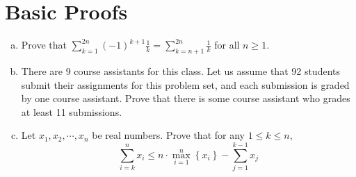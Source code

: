 \documentclass{article}
\begin{document}
\section{Basic Proofs}

\begin{enumerate}[(a)]
	\item Prove that $\sum_{k=1}^{2n}(-1)^{k+1}\frac{1}{k} = \sum_{k=n+1}^{2n}\frac{1}{k}$ for all $n\ge 1.$ 

	\item There are 9 course assistants for this class. Let us assume that 92 students submit their assignments for this problem set, and each submission is graded by one course assistant. Prove that there is some course assistant who grades at least 11 submissions.

	\item Let $x_1, x_2, \cdots, x_n$ be real numbers. Prove that for any $1\le k\le n,$
		\[\sum_{i=k}^{n} x_i\le n\cdot\max_{i=1}^n \left\{ x_i \right\} - \sum_{j=1}^{k-1} x_j\]

\end{enumerate}
\end{document}
